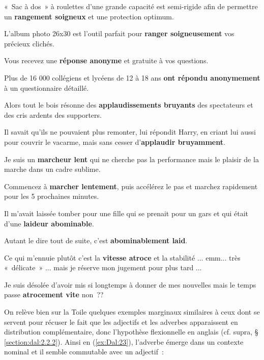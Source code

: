 \documentclass[output=paper]{langsci/langscibook}
\begin{document}
\ea\label{ex:Dal:22}
  \begin{xlist}
     «~Sac à dos~» à roulettes d'une grande capacité est semi-rigide afin de permettre un \textbf{rangement soigneux} et une protection optimum.

     L'album photo 26x30 est l'outil parfait pour \textbf{ranger soigneusement} vos précieux clichés.

     Vous recevez une \textbf{réponse anonyme} et gratuite à vos questions.

     Plus de 16 000 collégiens et lycéens de 12 à 18 ans \textbf{ont répondu anonymement} à un questionnaire détaillé.

     Alors tout le bois résonne des \textbf{applaudissements bruyants} des spectateurs et des cris ardents des supporters.

     Il savait qu'ils ne pouvaient plus remonter, lui répondit Harry, en criant lui aussi pour couvrir le vacarme, mais sans cesser d'\textbf{applaudir bruyamment}.

     Je suis un \textbf{marcheur lent} qui ne cherche pas la performance mais le plaisir de la marche dans un cadre sublime.

     Commencez à \textbf{marcher lentement}, puis accélérez le pas et marchez rapidement pour les 5 prochaines minutes.

     Il m'avait laissée tomber pour une fille qui se prenait pour un gars et qui était d'une \textbf{laideur abominable}.

     Autant le dire tout de suite, c'est \textbf{abominablement laid}.

     Ce qui m'ennuie plutôt c'est la \textbf{vitesse atroce} et la stabilité ... emm... très «~délicate~» ... mais je réserve mon jugement pour plus tard ...

     Je suis désolée d'avoir mis si longtemps à donner de mes nouvelles mais le temps passe \textbf{atrocement vite} non~??
  \end{xlist}
\z

On relève bien sur la Toile quelques exemples marginaux similaires à ceux dont se servent %
\citet{Payne10} %
%
pour récuser le fait que les adjectifs et les adverbes apparaissent en distribution complémentaire, donc l'hypothèse flexionnelle en anglais (cf. supra, § \ref{section:dal:2.2.2}). Ainsi en (\ref{ex:Dal:23}), l'adverbe émerge dans un contexte nominal et il semble commutable avec un adjectif~:
\end{document}
